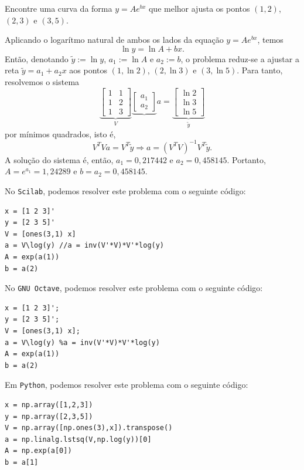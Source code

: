 \begin{ex}Encontre uma curva da forma $y=Ae^{bx}$ que melhor ajusta os pontos $(1, 2)$, $(2, 3)$ e $(3, 5)$.
\end{ex}
\begin{sol}
  Aplicando o logarítmo natural de ambos os lados da equação $y=Ae^{bx}$, temos
\begin{equation*}
  \ln y = \ln A + bx.
\end{equation*}
Então, denotando $\tilde{y} := \ln y$, $a_1 := \ln A$ e $a_2 := b$, o problema reduz-se a ajustar a reta $\tilde{y} = a_1 + a_2x$ aos pontos $(1, \ln 2)$, $(2, \ln 3)$ e $(3, \ln 5)$. Para tanto, resolvemos o sistema
\begin{equation*}
  \underbrace{\begin{bmatrix}
    1 & 1\\
    1 & 2\\
    1 & 3
  \end{bmatrix}}_{V}
  \underbrace{\begin{bmatrix}
    a_1\\
    a_2
  \end{bmatrix}}{a} = 
  \underbrace{\begin{bmatrix}
    \ln 2\\
    \ln 3\\
    \ln 5
  \end{bmatrix}}_{\tilde{y}}
\end{equation*}
por mínimos quadrados, isto é, 
\begin{equation*}
 V^TVa = V^T\tilde{y} \Rightarrow a = \left(V^TV\right)^{-1}V^T\tilde{y}.
\end{equation*}
A solução do sistema é, então, $a_1=0,217442$ e $a_2=0,458145$. Portanto, $A=e^{a_1}=1,24289$ e $b=a_2=0,458145$.

\ifisscilab
No \verb+Scilab+, podemos resolver este problema com o seguinte código:
\begin{verbatim}
x = [1 2 3]'
y = [2 3 5]'
V = [ones(3,1) x]
a = V\log(y) //a = inv(V'*V)*V'*log(y)
A = exp(a(1))
b = a(2)
\end{verbatim}
\fi
\ifisoctave
No \verb+GNU Octave+, podemos resolver este problema com o seguinte código:
\begin{verbatim}
x = [1 2 3]';
y = [2 3 5]';
V = [ones(3,1) x];
a = V\log(y) %a = inv(V'*V)*V'*log(y)
A = exp(a(1))
b = a(2)
\end{verbatim}
\fi
\ifispython
Em \verb+Python+, podemos resolver este problema com o seguinte código:
\begin{verbatim}
x = np.array([1,2,3])
y = np.array([2,3,5])
V = np.array([np.ones(3),x]).transpose()
a = np.linalg.lstsq(V,np.log(y))[0]
A = np.exp(a[0])
b = a[1]
\end{verbatim}
\fi
\end{sol}

